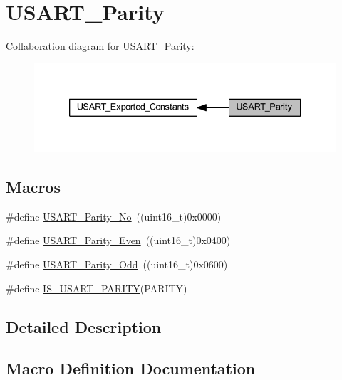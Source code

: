 \hypertarget{group___u_s_a_r_t___parity}{}\section{U\+S\+A\+R\+T\+\_\+\+Parity}
\label{group___u_s_a_r_t___parity}
Collaboration diagram for U\+S\+A\+R\+T\+\_\+\+Parity\+:
\nopagebreak
\begin{figure}[H]
\begin{center}
\leavevmode
\includegraphics[width=339pt]{group___u_s_a_r_t___parity}
\end{center}
\end{figure}
\subsection*{Macros}
\begin{DoxyCompactItemize}
\item 
\#define \hyperlink{group___u_s_a_r_t___parity_gab9deebcb0a859360dfec85074abaa3aa}{U\+S\+A\+R\+T\+\_\+\+Parity\+\_\+\+No}~((uint16\+\_\+t)0x0000)
\item 
\#define \hyperlink{group___u_s_a_r_t___parity_ga62193247d36fffe982e159c1f246271e}{U\+S\+A\+R\+T\+\_\+\+Parity\+\_\+\+Even}~((uint16\+\_\+t)0x0400)
\item 
\#define \hyperlink{group___u_s_a_r_t___parity_gafcd68937a6b4b8ffff8f96e68d6a5ecd}{U\+S\+A\+R\+T\+\_\+\+Parity\+\_\+\+Odd}~((uint16\+\_\+t)0x0600)
\item 
\#define \hyperlink{group___u_s_a_r_t___parity_gaa87b2e338e0ccc42887d3c56901bee87}{I\+S\+\_\+\+U\+S\+A\+R\+T\+\_\+\+P\+A\+R\+I\+TY}(P\+A\+R\+I\+TY)
\end{DoxyCompactItemize}


\subsection{Detailed Description}


\subsection{Macro Definition Documentation}
\mbox{\label{group___u_s_a_r_t___parity_gaa87b2e338e0ccc42887d3c56901bee87}} 
